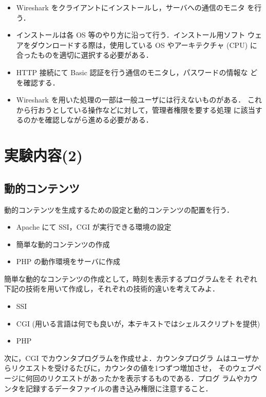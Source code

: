  \begin{itemize}
 \item Wireshark をクライアントにインストールし，サーバへの通信のモニタ
       を行う．
 \item インストールは各 OS 等のやり方に沿って行う．インストール用ソフト
       ウェアをダウンロードする際は，使用している OS やアーキテクチャ 
       (CPU) に合ったものを適切に選択する必要がある．
 \item HTTP 接続にて Basic 認証を行う通信のモニタし，パスワードの情報な
       どを確認する．
 \item Wireshark を用いた処理の一部は一般ユーザには行えないものがある．
       これから行おうとしている操作などに対して，管理者権限を要する処理
       に該当するのかを確認しながら進める必要がある．
 \end{itemize}


\section{実験内容(2)}

\subsection*{動的コンテンツ}

動的コンテンツを生成するための設定と動的コンテンツの配置を行う．
\begin{itemize}
\item Apache にて SSI，CGI が実行できる環境の設定
\item 簡単な動的コンテンツの作成
\item PHP の動作環境をサーバに作成
\end{itemize}

簡単な動的なコンテンツの作成として，時刻を表示するプログラムをそ
れぞれ下記の技術を用いて作成し，それぞれの技術的違いを考えてみよ．
\begin{itemize}
 \item SSI
 \item CGI (用いる言語は何でも良いが，本テキストではシェルスクリプトを提供)
 \item PHP
\end{itemize}

次に，CGI でカウンタプログラムを作成せよ．カウンタプログラ
ムはユーザからリクエストを受けるたびに，カウンタの値を1つずつ増加させ，
そのウェブページに何回のリクエストがあったかを表示するものである．プログ
ラムやカウンタを記録するデータファイルの書き込み権限に注意すること．

